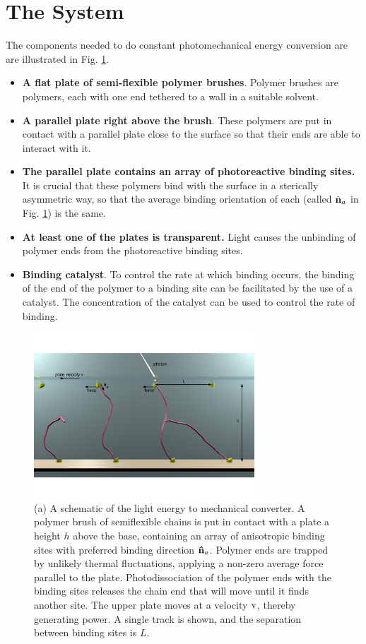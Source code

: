 \documentclass[journal = mamobx, manuscript = article]{achemso}
\begin{document}
\section{The System}
\label{sec:System}
The components needed to do constant photomechanical energy conversion are
are illustrated in Fig.  \ref{fig:device}.
\begin{itemize}
\item {\bf A flat plate of semi-flexible polymer brushes}. Polymer brushes are
polymers, each with one end tethered to a wall in a suitable solvent.
\item  {\bf A parallel plate right above the brush}. 
These polymers are put in contact with a parallel
plate close to the surface so that their ends are able to interact with it.
\item {\bf The parallel plate contains an array of photoreactive binding
sites.} It is crucial that these
polymers bind with the surface in a sterically asymmetric way, 
so that the average binding orientation of each (called $\hat{\bf n}_a$ in Fig. \ref{fig:device}) is the same.
\item {\bf At least one of the plates is transparent.} Light 
causes the unbinding of polymer ends from the photoreactive binding sites. 
\item {\bf Binding catalyst}. To control the rate at which binding occurs, the
binding of the end of the polymer to a binding site can be facilitated by the
use of a catalyst. The concentration of the catalyst can be used to control the
rate of binding. 
\end{itemize}

\begin{figure}[htp]
\begin{center}
\includegraphics[width = 3.25in]{Fig1_label}
\caption{
(a) A schematic of the light energy to mechanical converter. A polymer
brush of semiflexible chains is put in contact
with a  plate a height $h$ above the base, containing an array of anisotropic binding sites with preferred binding direction ${\bf \hat n}_a$. Polymer ends are trapped by unlikely thermal fluctuations, applying a non-zero average force parallel to
the plate. Photodissociation of the polymer ends 
with the binding sites releases the chain end that will move until it finds
another site. The upper plate moves at a velocity $\rm v$, thereby generating
power. A single track is shown, and the separation between binding sites is $L$.
}
\label{fig:device}
\end{center}
\end{figure}
\end{document}
